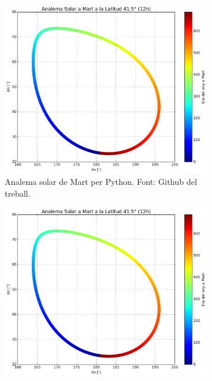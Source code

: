 \documentclass[a4paper, 11pt]{article}
\begin{document}
\begin{figure}[h!]
    \centering
    \begin{subfigure}{0.45\textwidth}
        \centering
        \includegraphics[width=\textwidth]{images/analema_Mart.png}
        \caption{Analema solar de Mart per Python. Font: Github del treball.}
    \end{subfigure}
    \hspace{0.05\textwidth}
    \begin{subfigure}{0.45\textwidth}
        \centering
        \includegraphics[width=\textwidth]{images/analema_Mart.png}

\end{subfigure}
\end{figure}
\end{document}
